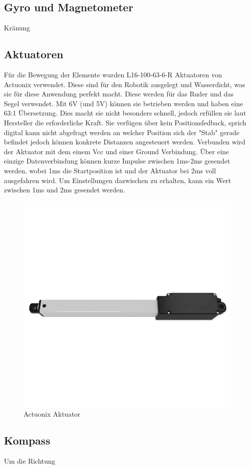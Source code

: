 \subsection{Gyro und Magnetometer}
Kränung
\subsection{Aktuatoren}
Für die Bewegung der Elemente wurden L16-100-63-6-R Aktuatoren von Actuonix verwendet. Diese sind für den Robotik ausgelegt und Wasserdicht, was sie für diese Anwendung perfekt macht. Diese werden für das Ruder und das Segel verwendet. Mit 6V (und 5V) können sie betrieben werden und haben eine 63:1 Übersetzung. Dies macht sie nicht besonders schnell, jedoch erfüllen sie laut Hersteller die erforderliche Kraft.
Sie verfügen über kein Positionsfedback, sprich digital kann nicht abgefragt werden an welcher Position sich der "Stab" gerade befindet jedoch können konkrete Distanzen angesteuert werden. Verbunden wird der Aktuator mit dem einem Vcc und einer Ground Verbindung. Über eine einzige Datenverbindung können kurze Impulse zwischen 1ms-2ms gesendet werden, wobei 1ms die Startposition ist und der Aktuator bei 2ms voll ausgefahren wird. Um Einstellungen dazwischen zu erhalten, kann ein Wert zwischen 1ms und 2ms gesendet werden.  
\begin{figure}[H] 
    \centering
    \includegraphics[width=0.5\linewidth]{actuonix.png}
    \caption{Actuonix Aktuator}
    \label{fig:actuator}
\end{figure}

\subsection{Kompass}
Um die Richtung 

